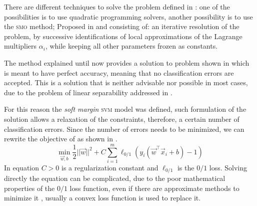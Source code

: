 There are different techniques to solve the problem defined in : one of the possibilities is to use quadratic
programming solvers, another possibility is to use the \textsc{smo} method; Proposed in
\cite{platt1998} and consisting of: an iterative resolution of the problem, by successive
identifications of local approximations of the Lagrange multipliers $\alpha_i$, while keeping all
other parameters frozen as constants.

\medskip

The method explained until now provides a solution to problem shown in  which is meant to
have perfect accuracy, meaning that no classification errors are accepted. This is a solution that
is neither advisable nor possible in most cases, due to the problem of linear separability addressed
in .

For this reason the \emph{soft margin} \textsc{svm} model was defined, such formulation of the solution
allows a relaxation of the constraints, therefore, a certain number of classification errors.
Since the number of errors needs to be minimized, we can rewrite the objective of  as
shown in .
\begin{equation}
	\label{eq:sm-primal}
	\min_{\vec{w}, b} \frac{1}{2}||\vec{w}||^2 + C\sum_{i = 1}^m \ell_{0 / 1}(y_i (\vec{w}^\top \vec{x}_i + b) - 1)
\end{equation}
In equation  $C > 0$ is a regularization constant and $\ell_{0 / 1}$ is the $0/1$
loss. Solving directly the equation can be complicated, due to the poor mathematical properties of
the $0/1$ loss function, even if there are approximate methods to minimize it \cite{nguyen2013},
usually a convex loss function is used to replace it.

